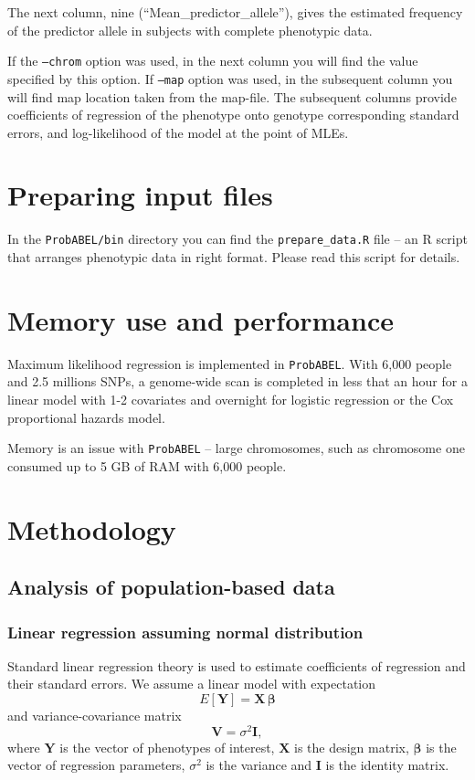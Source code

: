 \documentclass[12pt,a4paper]{article}
\begin{document}
The next column, nine (``Mean\_predictor\_allele''), gives the estimated
frequency of the predictor allele in subjects with complete phenotypic data.

If the \texttt{--chrom} option was used, in the next column you will
find the value specified by this option. If \texttt{--map} option was
used, in the subsequent column you will find map location taken from
the map-file. The subsequent columns provide coefficients of
regression of the phenotype onto genotype corresponding standard
errors, and log-likelihood %
of the model at the point of MLEs.


\section{Preparing input files}
In the \texttt{ProbABEL/bin} directory you can find the
\texttt{prepare\_data.R} file -- an R script that arranges phenotypic
data in right format. Please read this script for details.

\section{Memory use and performance}
Maximum likelihood regression is implemented in
\texttt{ProbABEL}. With 6,000 people and 2.5 millions SNPs, a
genome-wide scan is completed in less that an hour for a linear model
with 1-2 covariates and overnight for logistic regression or the Cox
proportional hazards model.

Memory is an issue with \texttt{ProbABEL} -- large chromosomes,
such as chromosome one consumed up to 5 GB of RAM with 6,000 people.

\section{Methodology}
\label{sec:methodology}
\subsection{Analysis of population-based data}
\subsubsection{Linear regression assuming normal distribution}
Standard linear regression theory is used to estimate coefficients of
regression and their standard errors. We assume a linear model with
expectation
\begin{equation}
  E[\mathbf{Y}] = \mathbf{X}\, \boldsymbol{\beta}
\label{expectation}
\end{equation}
and variance-covariance matrix
$$
\mathbf{V} = \sigma^2 \mathbf{I},
$$
where $\mathbf{Y}$ is the vector of phenotypes of interest,
$\mathbf{X}$ is the design matrix, $\boldsymbol{\beta}$ is the vector
of regression parameters, $\sigma^2$ is the variance and $\mathbf{I}$
is the identity matrix.
\end{document}
